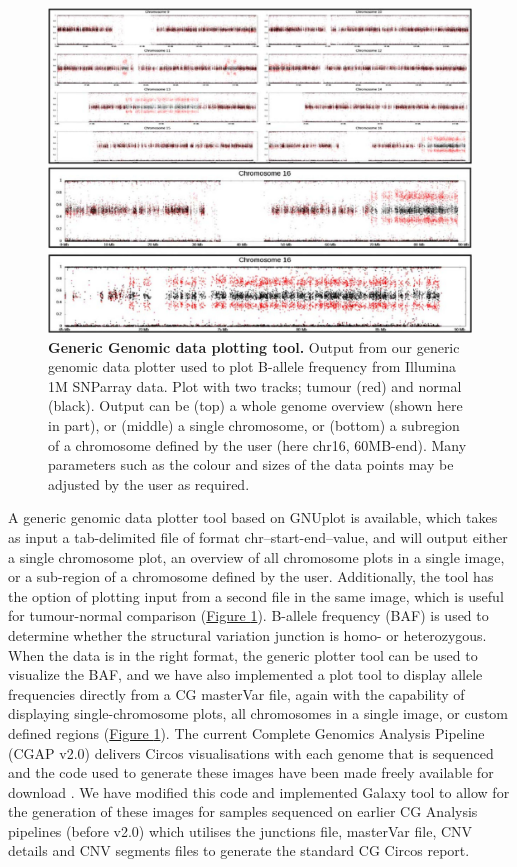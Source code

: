 \begin{figure}[t!]
\centering
\includegraphics[scale=1.5]{chapters/images/cgtag/fig1-plotter.png}
\caption{\textbf{Generic Genomic data plotting tool.} Output from our generic genomic data plotter used to plot B-allele frequency from Illumina 1M SNParray data. Plot with two tracks; tumour (red) and normal (black). Output can be (top) a whole genome overview (shown here in part), or (middle) a single chromosome, or (bottom) a subregion of a chromosome defined by the user (here chr16, 60MB-end). Many parameters such as the colour and sizes of the data points may be adjusted by the user as required.}
\label{fig:plotter}
\end{figure}

A generic genomic data plotter tool based on GNUplot is available, which takes as input a tab-delimited file of format chr–start-end–value, and will output either a single chromosome plot, an overview of all chromosome plots in a single image,  or a sub-region of a chromosome defined by the user. Additionally, the tool has the option of plotting input from a second file in the same image, which is useful for tumour-normal comparison (\hyperref[fig:plotter]{Figure \ref{fig:plotter}}). B-allele frequency (BAF) is used to determine whether the structural variation junction is homo- or heterozygous. When the data is in the right format, the generic plotter tool can be used to visualize the BAF, and we have also implemented a plot tool to display allele frequencies directly from a CG masterVar file, again with the capability of displaying single-chromosome plots, all chromosomes in a single image, or custom defined regions (\hyperref[fig:plotter]{Figure \ref{fig:plotter}}). The current Complete Genomics  Analysis Pipeline (CGAP v2.0) delivers Circos \cite{url-circos} visualisations with each genome that is sequenced and the code used to generate these images have been made freely available for download \cite{url-cgcircos}.  We have modified this code and implemented Galaxy tool to allow for the generation of these images for samples sequenced on earlier CG Analysis pipelines (before v2.0) which utilises the junctions file, masterVar file, CNV details and CNV segments files to generate the standard CG Circos report.


